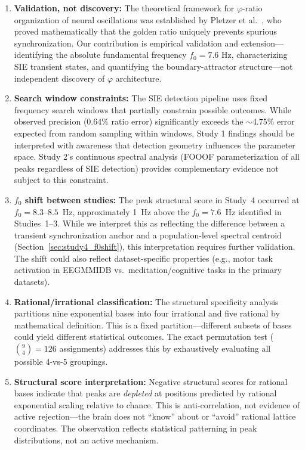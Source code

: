 \documentclass[11pt,a4paper]{article}
\newcommand{\phisym}{\varphi}
\begin{document}
\begin{enumerate}
    \item \textbf{Validation, not discovery:} The theoretical framework for $\phisym$-ratio organization of neural oscillations was established by Pletzer et al.\ \parencite{pletzer2010golden}, who proved mathematically that the golden ratio uniquely prevents spurious synchronization. Our contribution is empirical validation and extension---identifying the absolute fundamental frequency $f_0 = 7.6$ Hz, characterizing SIE transient states, and quantifying the boundary-attractor structure---not independent discovery of $\phisym$ architecture.

    \item \textbf{Search window constraints:} The SIE detection pipeline uses fixed frequency search windows that partially constrain possible outcomes. While observed precision (0.64\% ratio error) significantly exceeds the $\sim$4.75\% error expected from random sampling within windows, Study 1 findings should be interpreted with awareness that detection geometry influences the parameter space. Study 2's continuous spectral analysis (FOOOF parameterization of all peaks regardless of SIE detection) provides complementary evidence not subject to this constraint.

    \item \textbf{$f_0$ shift between studies:} The peak structural score in Study~4 occurred at $f_0 = 8.3$--$8.5$~Hz, approximately 1~Hz above the $f_0 = 7.6$~Hz identified in Studies~1--3. While we interpret this as reflecting the difference between a transient synchronization anchor and a population-level spectral centroid (Section~\ref{sec:study4_f0shift}), this interpretation requires further validation. The shift could also reflect dataset-specific properties (e.g., motor task activation in EEGMMIDB vs.\ meditation/cognitive tasks in the primary datasets).

    \item \textbf{Rational/irrational classification:} The structural specificity analysis partitions nine exponential bases into four irrational and five rational by mathematical definition. This is a fixed partition---different subsets of bases could yield different statistical outcomes. The exact permutation test ($\binom{9}{4} = 126$ assignments) addresses this by exhaustively evaluating all possible 4-vs-5 groupings.

    \item \textbf{Structural score interpretation:} Negative structural scores for rational bases indicate that peaks are \textit{depleted} at positions predicted by rational exponential scaling relative to chance. This is anti-correlation, not evidence of active rejection---the brain does not ``know'' about or ``avoid'' rational lattice coordinates. The observation reflects statistical patterning in peak distributions, not an active mechanism.
\end{enumerate}
\end{document}
